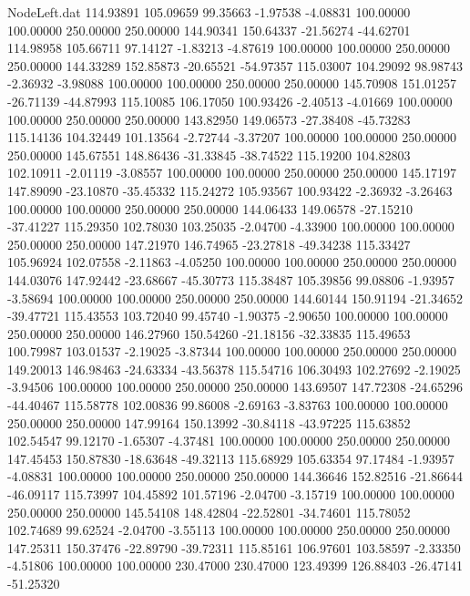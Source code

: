 \begin{filecontents}{NodeLeft.dat}
 114.93891  105.09659   99.35663    -1.97538   -4.08831  100.00000  100.00000  250.00000  250.00000  144.90341  150.64337  -21.56274  -44.62701
 114.98958  105.66711   97.14127    -1.83213   -4.87619  100.00000  100.00000  250.00000  250.00000  144.33289  152.85873  -20.65521  -54.97357
 115.03007  104.29092   98.98743    -2.36932   -3.98088  100.00000  100.00000  250.00000  250.00000  145.70908  151.01257  -26.71139  -44.87993
 115.10085  106.17050  100.93426    -2.40513   -4.01669  100.00000  100.00000  250.00000  250.00000  143.82950  149.06573  -27.38408  -45.73283
 115.14136  104.32449  101.13564    -2.72744   -3.37207  100.00000  100.00000  250.00000  250.00000  145.67551  148.86436  -31.33845  -38.74522
 115.19200  104.82803  102.10911    -2.01119   -3.08557  100.00000  100.00000  250.00000  250.00000  145.17197  147.89090  -23.10870  -35.45332
 115.24272  105.93567  100.93422    -2.36932   -3.26463  100.00000  100.00000  250.00000  250.00000  144.06433  149.06578  -27.15210  -37.41227
 115.29350  102.78030  103.25035    -2.04700   -4.33900  100.00000  100.00000  250.00000  250.00000  147.21970  146.74965  -23.27818  -49.34238
 115.33427  105.96924  102.07558    -2.11863   -4.05250  100.00000  100.00000  250.00000  250.00000  144.03076  147.92442  -23.68667  -45.30773
 115.38487  105.39856   99.08806    -1.93957   -3.58694  100.00000  100.00000  250.00000  250.00000  144.60144  150.91194  -21.34652  -39.47721
 115.43553  103.72040   99.45740    -1.90375   -2.90650  100.00000  100.00000  250.00000  250.00000  146.27960  150.54260  -21.18156  -32.33835
 115.49653  100.79987  103.01537    -2.19025   -3.87344  100.00000  100.00000  250.00000  250.00000  149.20013  146.98463  -24.63334  -43.56378
 115.54716  106.30493  102.27692    -2.19025   -3.94506  100.00000  100.00000  250.00000  250.00000  143.69507  147.72308  -24.65296  -44.40467
 115.58778  102.00836   99.86008    -2.69163   -3.83763  100.00000  100.00000  250.00000  250.00000  147.99164  150.13992  -30.84118  -43.97225
 115.63852  102.54547   99.12170    -1.65307   -4.37481  100.00000  100.00000  250.00000  250.00000  147.45453  150.87830  -18.63648  -49.32113
 115.68929  105.63354   97.17484    -1.93957   -4.08831  100.00000  100.00000  250.00000  250.00000  144.36646  152.82516  -21.86644  -46.09117
 115.73997  104.45892  101.57196    -2.04700   -3.15719  100.00000  100.00000  250.00000  250.00000  145.54108  148.42804  -22.52801  -34.74601
 115.78052  102.74689   99.62524    -2.04700   -3.55113  100.00000  100.00000  250.00000  250.00000  147.25311  150.37476  -22.89790  -39.72311
 115.85161  106.97601  103.58597    -2.33350   -4.51806  100.00000  100.00000  230.47000  230.47000  123.49399  126.88403  -26.47141  -51.25320

\end{filecontents}
